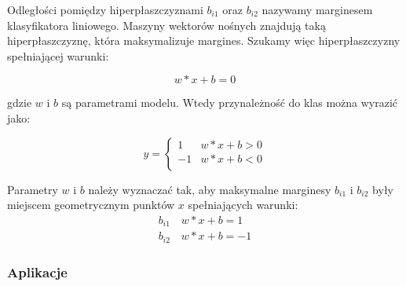Odległości pomiędzy hiperpłaszczyznami $b_{i1}$ oraz $b_{i2}$ nazywamy marginesem klasyfikatora liniowego. Maszyny wektorów nośnych znajdują taką hiperpłaszczyznę, która maksymalizuje margines. Szukamy więc hiperpłaszczyzny spełniającej warunki:

\begin{equation}
    w*x + b =0
\end{equation}

gdzie $w$ i $b$ są parametrami modelu. Wtedy przynależność do klas można wyrazić jako:

\begin{displaymath}
    y = \left\{ \begin{array}{ll}
        1 & \textrm{$w*x+b>0$}\\
        -1 & \textrm{$w*x+b<0$}\\
    \end{array} \right.
\end{displaymath}

Parametry $w$ i $b$ należy wyznaczać tak, aby maksymalne marginesy $b_{i1}$ i $b_{i2}$ były miejscem geometrycznym punktów $x$ spełniających warunki:
\begin{eqnarray}
    b_{i1} \quad w*x + b =1 \\
    b_{i2} \quad w*x + b =-1
\end{eqnarray}

\subsubsection{Aplikacje}

